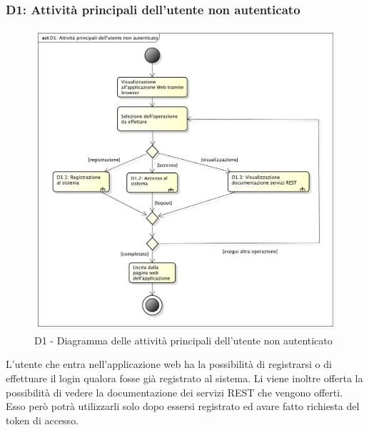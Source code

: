 		\subsubsection{D1: Attività principali dell'utente non autenticato} %
		\label{ssub:attivita_principali_dell_utente_non_autenticato}
		\begin{figure}[!htbp]
			\centering
			\centerline{\includegraphics[scale=0.40]{./images/D1.pdf}}
			\caption{D1 - Diagramma delle attività principali dell'utente non autenticato}
		\end{figure}
		\noindent
		L'utente che entra nell'applicazione web ha la possibilità di registrarsi o di effettuare il login qualora fosse già registrato al sistema. Li viene inoltre offerta la possibilità di vedere la documentazione dei servizi REST che vengono offerti. Esso però potrà utilizzarli solo dopo essersi registrato ed avare fatto richiesta del token di accesso.



